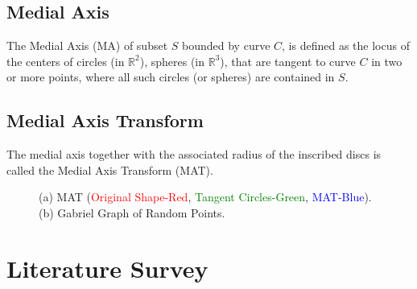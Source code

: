 \documentclass[preprint,5p,times,twocolumn]{elsarticle}
\begin{document}
\subsection{Medial Axis}
The Medial Axis (MA) of subset $S$ bounded by curve $C$, is defined as the locus of the centers of circles (in $\mathbb{R}^2$), spheres (in $\mathbb{R}^3$), that are tangent to curve $C$ in two or more points, where all such circles (or spheres) are contained in $S$.

\subsection{Medial Axis Transform}
The medial axis together with the associated radius of the inscribed discs is called the Medial Axis Transform (MAT).


\begin{figure}[!h]
	\centering
	\caption{
		(a) MAT (\textcolor{red}{Original Shape-Red}, \textcolor{green}{Tangent Circles-Green}, \textcolor{blue}{MAT-Blue}). (b) Gabriel Graph of Random Points.
	}
\end{figure}


\section{Literature Survey}
\end{document}
